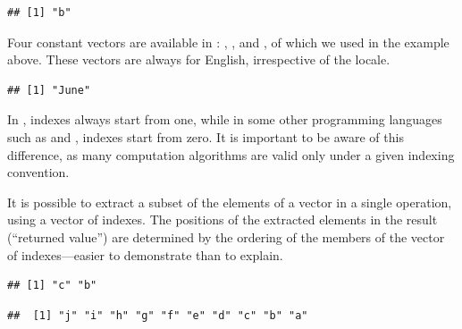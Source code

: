 \documentclass[krantz2]{krantz}\usepackage{knitr}
\begin{document}
\begin{knitrout}\footnotesize
{}\color{fgcolor}\begin{kframe}
\begin{alltt}
\hlstd{a[}\hlstd{]}
\end{alltt}
\begin{verbatim}
## [1] "b"
\end{verbatim}
\end{kframe}
\end{knitrout}

\begin{explainbox}
Four constant vectors are available in \Rlang: , ,  and  , of which we used  in the example above. These vectors are always for English, irrespective of the locale.

\begin{knitrout}\footnotesize
{}\color{fgcolor}\begin{kframe}
\begin{alltt}
\hlstd{month.name[}\hlstd{]}
\end{alltt}
\begin{verbatim}
## [1] "June"
\end{verbatim}
\end{kframe}
\end{knitrout}
\end{explainbox}

\begin{warningbox}
In \Rlang, indexes always start from one, while in some other programming languages such as \Clang and \Cpplang, indexes start from zero. It is important to be aware of this difference, as many computation algorithms are valid only under a given indexing convention.
\end{warningbox}

It is possible to extract a subset of the elements of a vector in a single operation, using a vector of indexes. The positions of the extracted elements in the result (``returned value'') are determined by the ordering of the members of the vector of indexes---easier to demonstrate than to explain.

\begin{knitrout}\footnotesize
{}\color{fgcolor}\begin{kframe}
\begin{alltt}
\hlstd{a[}\hlstd{(}\hlstd{,} \hlstd{)]}
\end{alltt}
\begin{verbatim}
## [1] "c" "b"
\end{verbatim}
\begin{alltt}
\hlstd{a[}\hlopt{:}\hlstd{]}
\end{alltt}
\begin{verbatim}
##  [1] "j" "i" "h" "g" "f" "e" "d" "c" "b" "a"
\end{verbatim}
\end{kframe}
\end{knitrout}
\end{document}
